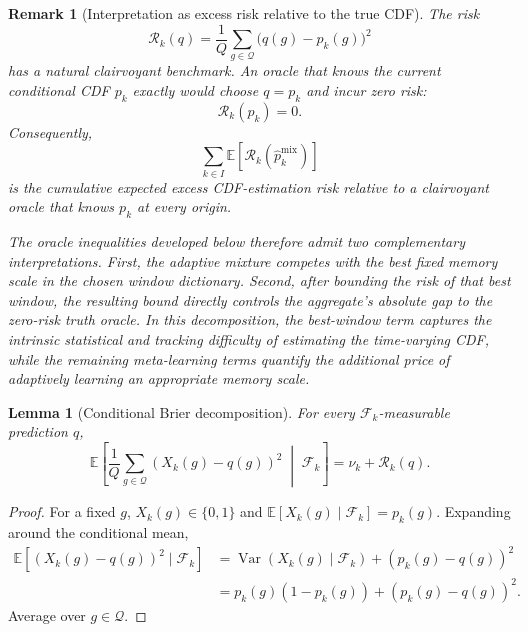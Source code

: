 \documentclass[11pt]{article}
\newtheorem{lemma}[theorem]{Lemma}
\newtheorem{remark}[theorem]{Remark}
\newcommand{\E}{\mathbb{E}}
\newcommand{\F}{\mathcal{F}}
\newcommand{\Q}{\mathcal{Q}}
\newcommand{\1}{\mathbf{1}}
\begin{document}
\begin{remark}[Interpretation as excess risk relative to the true CDF]
\label{rem:truth-oracle-risk}
The risk
\[
    \mathcal R_k(q)
    =
    \frac1Q
    \sum_{g\in\Q}
    \bigl(q(g)-p_k(g)\bigr)^2
\]
has a natural clairvoyant benchmark.  An oracle that knows the current
conditional CDF $p_k$ exactly would choose $q=p_k$ and incur zero risk:
\[
    \mathcal R_k(p_k)=0.
\]
Consequently,
\[
    \sum_{k\in I}
    \E\!\left[
        \mathcal R_k(\widehat p_k^{\mathrm{mix}})
    \right]
\]
is the cumulative expected excess CDF-estimation risk relative to a
clairvoyant oracle that knows $p_k$ at every origin.

The oracle inequalities developed below therefore admit two complementary
interpretations.  First, the adaptive mixture competes with the best fixed
memory scale in the chosen window dictionary.  Second, after bounding the
risk of that best window, the resulting bound directly controls the
aggregate's absolute gap to the zero-risk truth oracle.  In this decomposition,
the best-window term captures the intrinsic statistical and tracking
difficulty of estimating the time-varying CDF, while the remaining
meta-learning terms quantify the additional price of adaptively learning an
appropriate memory scale.
\end{remark}

\begin{lemma}[Conditional Brier decomposition]
\label{lem:brier-decomposition}
For every $\F_k$-measurable prediction $q$,
\begin{equation}
    \E\!\left[
        \frac1Q\sum_{g\in\Q}(X_k(g)-q(g))^2
        \;\middle|\;\F_k
    \right]
    =
    \nu_k+\mathcal R_k(q).
    \label{eq:brier-decomposition}
\end{equation}
\end{lemma}

\begin{proof}
For a fixed $g$, $X_k(g)\in\{0,1\}$ and
$\E[X_k(g)\mid\F_k]=p_k(g)$.  Expanding around the conditional mean,
\begin{align*}
    \E[(X_k(g)-q(g))^2\mid\F_k]
    &=
    \operatorname{Var}(X_k(g)\mid\F_k)
    +(p_k(g)-q(g))^2
    \\
    &=
    p_k(g)(1-p_k(g))+(p_k(g)-q(g))^2.
\end{align*}
Average over $g\in\Q$.
\end{proof}
\end{document}
